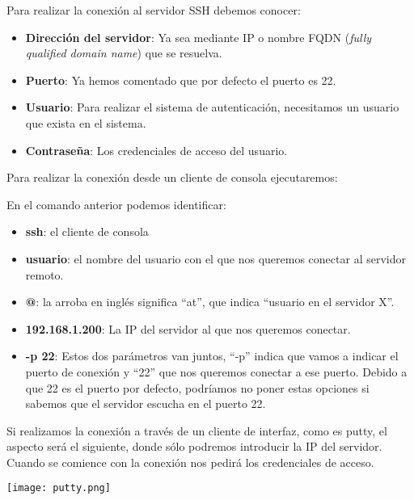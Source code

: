 Para realizar la conexión al servidor SSH debemos conocer:

\begin{itemize}
    \item \textbf{Dirección del servidor}: Ya sea mediante IP o nombre FQDN (\textit{fully qualified domain name}) que se resuelva.
    \item \textbf{Puerto}: Ya hemos comentado que por defecto el puerto es 22.
    \item \textbf{Usuario}: Para realizar el sistema de autenticación, necesitamos un usuario que exista en el sistema.
    \item \textbf{Contraseña}: Los credenciales de acceso del usuario.
\end{itemize}

Para realizar la conexión desde un cliente de consola ejecutaremos:


En el comando anterior podemos identificar:
\begin{itemize}
    \item \textbf{ssh}: el cliente de consola
    \item \textbf{usuario}: el nombre del usuario con el que nos queremos conectar al servidor remoto.
    \item \textbf{@}: la arroba en inglés significa “at”, que indica “usuario en el servidor X”.
    \item \textbf{192.168.1.200}: La IP del servidor al que nos queremos conectar.
    \item \textbf{-p 22}: Estos dos parámetros van juntos,  “-p” indica que vamos a indicar el puerto de conexión y “22” que nos queremos conectar a ese puerto. Debido a que 22 es el puerto por defecto, podríamos no poner estas opciones si sabemos que el servidor escucha en el puerto 22.
\end{itemize}

Si realizamos la conexión a través de un cliente de interfaz, como es putty, el aspecto será el siguiente, donde sólo podremos introducir la IP del servidor. Cuando se comience con la conexión nos pedirá los credenciales de acceso.

\begin{center}
    \texttt{[image: putty.png]}
\end{center}


